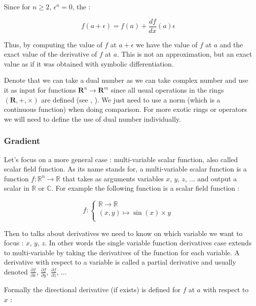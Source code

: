 \documentclass[12pt]{article}
\begin{document}
Since for $n \geq 2$, $\epsilon^n = 0$, the :

$$
f(a+\epsilon) = f(a) + \frac{df}{dx}(a) \epsilon
$$

Thus, by computing the value of $f$ at $a+\epsilon$ we have the value of $f$ at $a$ and the exact value of the derivative of $f$ at $a$. This is not an approximation, but an exact value as if it was obtained with symbolic differentiation.

Denote that we can take a dual number as we can take complex number and use it as input for functions $\mathbf{R}^n \rightarrow \mathbf{R}^m$ since all usual operations in the rings $(\mathbf{R},+, \times)$ are defined (see \cite{stackexchange_dual_number_for_scalar_functions}, \cite{pdf_analysis_dual_functions}). We just need to use a norm (which is a continuous function) when doing comparison.
For more exotic rings or operators we will need to define the use of dual number individually.

\subsubsection{Gradient}

Let's focus on a more general case : multi-variable scalar function, also called scalar field function. As its name stands for, a multi-variable scalar function is a function $f : \mathbb{R}^n \rightarrow \mathbb{R}$ that takes as arguments variables $x$, $y$, $z$, ... and output a scalar in $\mathbb{R}$ or $\mathbb{C}$. For example the following function is a scalar field function :

$$
f : 
\begin{cases}
\mathbb{R} \rightarrow \mathbb{R} \\
(x, y) \mapsto \sin(x) \times y \\
\end{cases}
$$

Then to talks about derivatives we need to know on which variable we want to focus : $x$, $y$, $z$. In other words the single variable function derivatives case extends to multi-variable by taking the derivatives of the function for each variable. A derivative with respect to a variable is called a partial derivative \cite{wiki_partial_derivative} and usually denoted $\frac{\partial{f}}{\partial{x}}$, $\frac{\partial{f}}{\partial{y}}$, $\frac{\partial{f}}{\partial{z}}$, ...

Formally the directional derivative (if exists) is defined for $f$ at $a$ with respect to $x$ :
\end{document}
